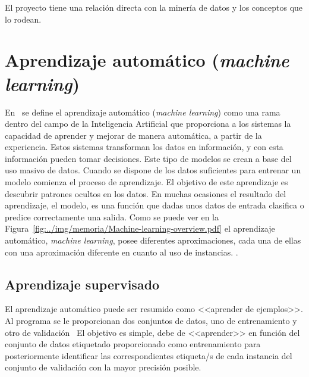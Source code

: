 
El proyecto tiene una relación directa con la minería de datos y los conceptos que lo rodean. 

\section{Aprendizaje automático (\textit{machine learning})}\label{sec:machine-learning}
En~\cite{sanchez_2020} se define el aprendizaje automático (\textit{machine learning}) como una rama dentro del campo de la Inteligencia Artificial que proporciona a los sistemas la capacidad de aprender y mejorar de manera automática, a partir de la experiencia. Estos sistemas transforman los datos en información, y con esta información pueden tomar decisiones. Este tipo de modelos se crean a base del uso masivo de datos. Cuando se dispone de los datos suficientes para entrenar un modelo comienza el proceso de aprendizaje. El objetivo de este aprendizaje es descubrir patrones ocultos en los datos. En muchas ocasiones el resultado del aprendizaje, el modelo, es una función que dadas unos datos de entrada clasifica o predice correctamente una salida. Como se puede ver en la Figura~\ref{fig:../img/memoria/Machine-learning-overview.pdf} el aprendizaje automático, \textit{machine learning}, posee diferentes aproximaciones, cada una de ellas con una aproximación diferente en cuanto al uso de instancias.
.

\subsection{Aprendizaje supervisado}\label{subsec:Aprendizaje-Supervisado}
El aprendizaje automático puede ser resumido como <<aprender de ejemplos>>. Al programa se le proporcionan dos conjuntos de datos, uno de entrenamiento y otro de validación~\cite{learned2014introduction} El objetivo es simple, debe de <<aprender>> en función del conjunto de datos etiquetado proporcionado como entrenamiento para posteriormente identificar las correspondientes etiqueta/s de cada instancia del conjunto de validación con la mayor precisión posible. 

